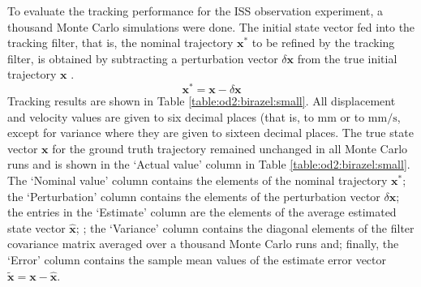 \documentclass[conference]{IEEEtran}
\begin{document}
To evaluate the tracking performance for the ISS observation experiment, a thousand Monte Carlo simulations were done. The initial state vector fed into the tracking filter, that is, the nominal trajectory $\mathbf{x}^\ast$ to be refined by the tracking filter, is obtained by subtracting a perturbation vector $\delta \mathbf{x}$ from the true initial trajectory $\mathbf{x}$ \cite{trackingfilterengineering}.
\begin{equation}
    \mathbf{x}^\ast = \mathbf{x} - \delta \mathbf{x}
\end{equation}
Tracking results are shown in Table \ref{table:od2:birazel:small}. All displacement and velocity values are given to six decimal places (that is, to $\mathrm{mm}$ or to $\mathrm{mm/s}$, except for variance where they are given to sixteen decimal places. The true state vector $\mathbf{x}$ for the ground truth trajectory remained unchanged in all Monte Carlo runs and is shown in the `Actual value' column in Table \ref{table:od2:birazel:small}. The `Nominal value' column contains the elements of the nominal trajectory $\mathbf{x}^\ast$; the `Perturbation' column contains the elements of the perturbation vector $\delta \mathbf{x}$; the entries in the `Estimate' column are the elements of the average estimated state vector $\hat{\mathbf{x}}$; ; the `Variance' column contains the diagonal elements of the filter covariance matrix averaged over a thousand Monte Carlo runs and; finally, the `Error' column contains the sample mean values of the estimate error vector $\tilde{\mathbf{x}} = \mathbf{x} - \hat{\mathbf{x}}$.



\end{document}
